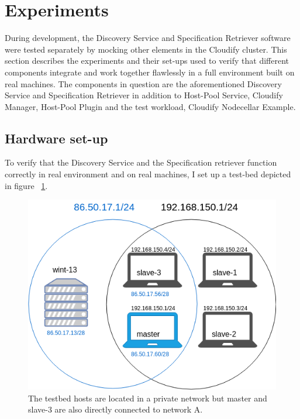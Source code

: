 \section{Experiments} \label{experiments}

During development, the Discovery Service and Specification Retriever software were tested separately by mocking other elements in the Cloudify cluster. This section describes the experiments and their set-ups used to verify that different components integrate and work together flawlessly in a full environment built on real machines. The components in question are the aforementioned Discovery Service and Specification Retriever in addition to Host-Pool Service, Cloudify Manager, Host-Pool Plugin and the test workload, Cloudify Nodecellar Example\cite{Nodecellar}.

\subsection{Hardware set-up}
To verify that the Discovery Service and the Specification retriever function correctly in real environment and on real machines, I set up a test-bed depicted in figure ~\ref{fig:network-venn}.

 \begin{figure}[ht!]
\centering
  \includegraphics[width=\textwidth, keepaspectratio]{Network-venn.png}%
  \caption{The testbed hosts are located in a private network but master and slave-3 are also directly connected to network A.}
  \label{fig:network-venn}
\end{figure}

